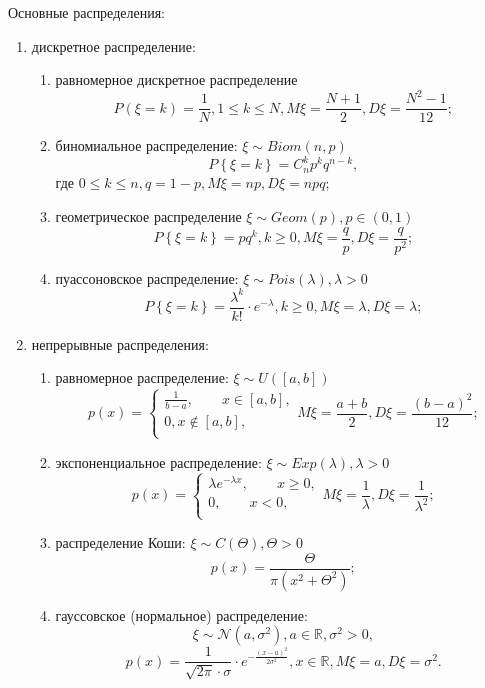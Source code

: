 Основные распределения:
\begin{enumerate}
\item дискретное распределение:
\begin{enumerate}
\item равномерное дискретное распределение
$$P \left( \xi = k \right) =
\frac{1}{N},
1 \leq k \leq N,
M \xi = \frac{N+1}{2}, D \xi = \frac{N^2 - 1}{12};$$
\item биномиальное распределение: $ \xi \sim Biom \left( n, p \right) $
$$P \left\{ \xi = k \right\} =
C_n^k p^k q^{n-k},$$
где $0 \leq k \leq n, q = 1 - p, M \xi = np, D \xi = npq$;
\item геометрическое распределение $ \xi \sim Geom \left( p \right), p \in \left( 0, 1 \right) $
$$P \left\{ \xi = k \right\} =
pq^k,
k \geq 0,
M \xi = \frac{q}{p},
D \xi = \frac{q}{p^2};$$
\item пуассоновское распределение: $ \xi \sim Pois \left( \lambda \right), \lambda > 0$
$$P \left\{ \xi = k \right\} = \frac{ \lambda^k}{k!} \cdot e^{- \lambda },
k \geq 0,
M \xi = \lambda,
D \xi = \lambda;$$
\end{enumerate}
\item непрерывные распределения:
\begin{enumerate}
\item равномерное распределение: $ \xi \sim U \left( \left[ a, b \right] \right) $
$$p \left( x \right) =
\begin{cases}
\frac{1}{b-a}, \qquad x \in \left[ a, b \right], \\
0, x \notin \left[ a, b \right], \\
\end{cases}
M \xi = \frac{a+b}{2},
D \xi = \frac{ \left( b-a \right)^2}{12};$$
\item экспоненциальное распределение: $ \xi \sim Exp \left( \lambda \right), \lambda > 0$
$$p \left( x \right) =
\begin{cases}
\lambda e^{- \lambda x}, \qquad x \geq 0, \\
0, \qquad x < 0, \\
\end{cases}
M \xi = \frac{1}{ \lambda },
D \xi = \frac{1}{ \lambda^2};$$
\item распределение Коши: $ \xi \sim C \left( \Theta \right), \Theta > 0$
$$p \left( x \right) =
\frac{ \Theta }{ \pi \left( x^2 + \Theta^2 \right) };$$
\item гауссовское (нормальное) распределение:
$$ \xi \sim \mathcal{N} \left( a, \sigma^2 \right),
a \in \mathbb{R},
\sigma^2 > 0,$$
$$p \left( x \right) = \frac{1}{ \sqrt{2 \pi } \cdot \sigma } \cdot e^{- \frac{ \left( x-a \right)^2}{2 \sigma^2}},
x \in \mathbb{R},
M \xi = a,
D \xi = \sigma^2.$$
\end{enumerate}
\end{enumerate}

